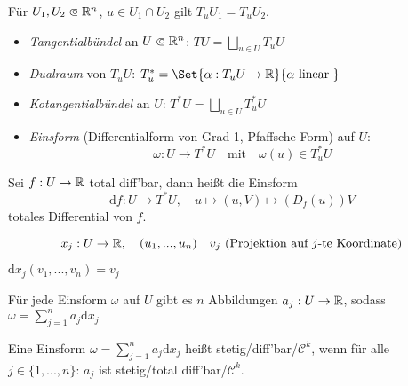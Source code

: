 \documentclass{cheat-sheet}
\begin{document}
\begin{bem}
  Für $U_1, U_2 \opn \R^n$, $u \in U_1 \cap U_2$ gilt $T_u U_1 = T_u U_2$.
\end{bem}

\begin{defn}
  \begin{itemize}
    \item \emph{Tangentialbündel} an $U \opn \R^n$: $TU = \bigsqcup_{u \in U} T_u U$
    \item \emph{Dualraum} von $T_u U$: $T_u^* = \Set{ \alpha : T_u U \to \R }{ \alpha \text{ linear } }$
    \item \emph{Kotangentialbündel} an $U$: $T^* U = \bigsqcup_{u \in U} T_u^* U$
    \item \emph{Einsform} (Differentialform von Grad 1, Pfaffsche Form) auf $U$:
\[ \omega : U \to T^*U \quad \text{mit} \quad \omega(u) \in T_u^*U \]
  \end{itemize}
\end{defn}


\begin{bsp}
  Sei $f : U \to \mathbb{R}$ total diff'bar, dann heißt die Einsform
  \[ \mathrm{d}f : U \to T^*U, \quad u \mapsto (u, V) \mapsto (D_f (u)) V \]
  totales Differential von $f$.
\end{bsp}

\begin{nota}
  \[ x_j : U \to \mathbb{R}, \quad (u_1, ..., u_n) \quad v_j \text{ (Projektion auf $j$-te Koordinate)} \]
\end{nota}

\begin{bem}
  $\mathrm{d}x_j (v_1, ..., v_n) = v_j$
\end{bem}


\begin{beobachtung}
  Für jede Einsform $\omega$ auf $U$ gibt es $n$ Abbildungen $a_j : U \to \mathbb{R}$, sodass
  $\omega = \sum_{j=1}^n a_j \mathrm{d}x_j$
\end{beobachtung}

\begin{defn}
  Eine Einsform $\omega = \sum_{j=1}^n a_j \mathrm{d}x_j$ heißt stetig/diff'bar/$\mathcal{C}^k$, wenn für alle $j \in \{ 1, ..., n \}$: $a_j$ ist stetig/total diff'bar/$\mathcal{C}^k$.
\end{defn}

\end{document}
